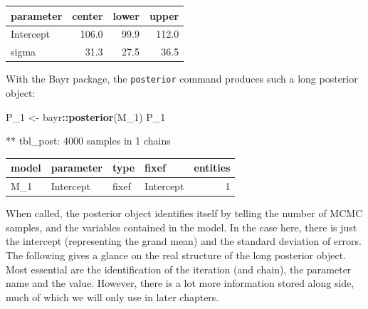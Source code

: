 \documentclass[]{svmono}
\newenvironment{Shaded}{\begin{snugshade}}{\end{snugshade}}
\newcommand{\KeywordTok}[1]{\textcolor[rgb]{0.13,0.29,0.53}{\textbf{#1}}}
\newcommand{\DataTypeTok}[1]{\textcolor[rgb]{0.13,0.29,0.53}{#1}}
\newcommand{\DecValTok}[1]{\textcolor[rgb]{0.00,0.00,0.81}{#1}}
\newcommand{\StringTok}[1]{\textcolor[rgb]{0.31,0.60,0.02}{#1}}
\newcommand{\OperatorTok}[1]{\textcolor[rgb]{0.81,0.36,0.00}{\textbf{#1}}}
\newcommand{\NormalTok}[1]{#1}
\begin{document}
\begin{Shaded}
\end{Shaded}

\begin{tabular}{l|r|r|r}
\hline
parameter & center & lower & upper\\
\hline
Intercept & 106.0 & 99.9 & 112.0\\
\hline
sigma & 31.3 & 27.5 & 36.5\\
\hline
\end{tabular}

With the Bayr package, the \texttt{posterior} command produces such a
long posterior object:

\begin{Shaded}
\begin{Highlighting}[]
\NormalTok{P_}\DecValTok{1}\NormalTok{ <-}\StringTok{ }\NormalTok{bayr}\OperatorTok{::}\KeywordTok{posterior}\NormalTok{(M_}\DecValTok{1}\NormalTok{)}
\NormalTok{P_}\DecValTok{1}
\end{Highlighting}
\end{Shaded}

** tbl\_post: 4000 samples in 1 chains

\begin{longtable}[]{@{}llllr@{}}
\toprule
model & parameter & type & fixef & entities\tabularnewline
\midrule
\endhead
M\_1 & Intercept & fixef & Intercept & 1\tabularnewline
\bottomrule
\end{longtable}

When called, the posterior object identifies itself by telling the
number of MCMC samples, and the variables contained in the model. In the
case here, there is just the intercept (representing the grand mean) and
the standard deviation of errors. The following gives a glance on the
real structure of the long posterior object. Most essential are the
identification of the iteration (and chain), the parameter name and the
value. However, there is a lot more information stored along side, much
of which we will only use in later chapters.
\end{document}
